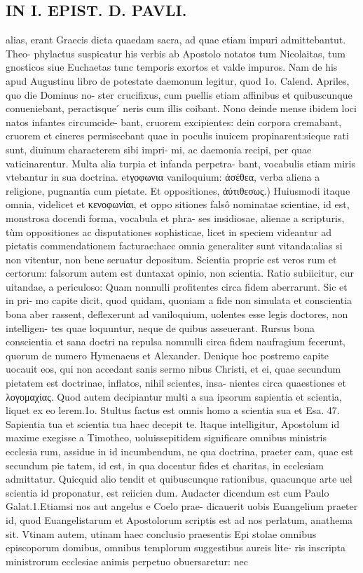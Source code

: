 \documentclass{article}
\begin{document}
\begin{pages}
\section*{IN I. EPIST. D. PAVLI. }
\marginpar{[ p.134 ]}\pstart alias, erant Graecis dicta quaedam sacra, ad quae etiam impuri admittebantut. Theo- phylactus suspicatur his verbis ab Apostolo notatos tum Nicolaitas, tum gnosticos siue Euchaetas tunc temporis exortos et valde impuros. Nam de his apud Augustinu libro de potestate daemonum legitur, quod 1o. Calend. Apriles, quo die Dominus no- ster crucifixus, cum puellis etiam affinibus et quibuscunque conueniebant, peractisque ́ neris cum illis coibant. Nono deinde mense ibidem loci natos infantes circumcide- bant, cruorem excipientes: dein corpora cremabant, cruorem et cineres permiscebant quae in poculis inuicem propinarent:sicque rati sunt, diuinum characterem sibi impri- mi, ac daemonia recipi, per quae vaticinarentur. Multa alia turpia et infanda perpetra- bant, vocabulis etiam miris vtebantur in sua doctrina. etγοφωνια vaniloquium: ἀσέθεα, verba aliena a religione, pugnantia cum pietate.  \pend\pstart Et oppositiones, ἀὐτιθεσως.) Huiusmodi itaque omnia, videlicet et κενοφωνίαι, et oppo sitiones falsô nominatae scientiae, id est, monstrosa docendi forma, vocabula et phra- ses insidiosae, alienae a scripturis, tùm oppositiones ac disputationes sophisticae, licet in speciem videantur ad pietatis commendationem facturae:haec omnia generaliter sunt vitanda:alias si non vitentur, non bene seruatur depositum. Scientia proprie est veros rum et certorum: falsorum autem est duntaxat opinio, non scientia. Ratio subiicitur, cur uitandae, a periculoso: Quam nonnulli profitentes circa fidem aberrarunt. Sic et in pri- mo capite dicit, quod quidam, quoniam a fide non simulata et conscientia bona aber rassent, deflexerunt ad vaniloquium, uolentes esse legis doctores, non intelligen- tes quae loquuntur, neque de quibus asseuerant. Rursus bona conscientia et sana doctri na repulsa nomnulli circa fidem naufragium fecerunt, quorum de numero Hymenaeus et Alexander. Denique hoc postremo capite uocauit eos, qui non accedant sanis sermo nibus Christi, et ei, quae secundum pietatem est doctrinae, inflatos, nihil scientes, insa- nientes circa quaestiones et λογομαχίας. Quod autem decipiantur multi a sua ipsorum sapientia et scientia, liquet ex eo lerem.1o. Stultus factus est omnis homo a scientia sua et Esa. 47. Sapientia tua et scientia tua haec decepit te. ltaque intelligitur, Apostolum id maxime exegisse a Timotheo, uoluissepitidem significare omnibus ministris ecclesia rum, assidue in id incumbendum, ne qua doctrina, praeter eam, quae est secundum pie tatem, id est, in qua docentur fides et charitas, in ecclesiam admittatur. Quicquid alio tendit et quibuscunque rationibus, quacunque arte uel scientia id proponatur, est reiicien dum. Audacter dicendum est cum Paulo Galat.1.Etiamsi nos aut angelus e Coelo prae- dicauerit uobis Euangelium praeter id, quod Euangelistarum et Apostolorum scriptis est ad nos perlatum, anathema sit. Vtinam autem, utinam haec conclusio praesentis Epi stolae omnibus episcoporum domibus, omnibus templorum suggestibus aureis lite- ris inscripta ministrorum ecclesiae animis perpetuo obuersaretur: nec 
\end{pages}
\end{document}
